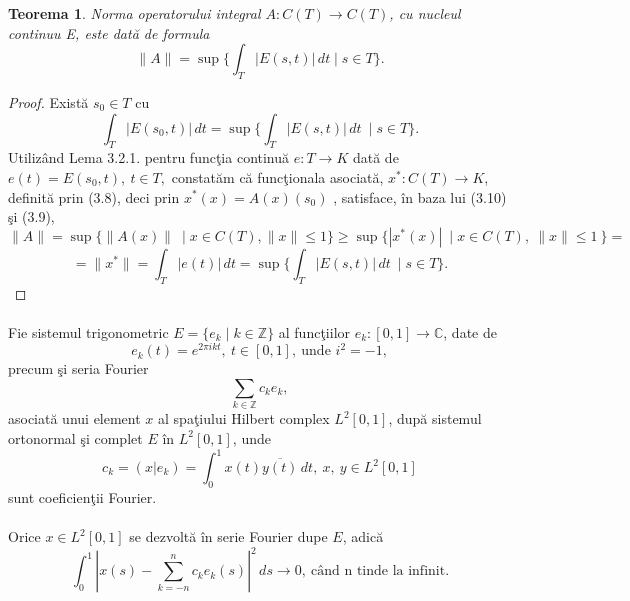 \documentclass[a4paper,openany,12pt]{report}
\newtheorem{theorem}{Teorema}[section]
\begin{document}
\begin{theorem}
Norma operatorului integral $A:C(T)\rightarrow C(T)$, cu nucleul continuu E, este dat\u a de formula
\begin{equation*}
\|A\| = \sup \bigg\{  \int_T \left| E(s,t)\right|\, dt \mid s \in T \bigg\}.
\end{equation*}
\end{theorem}
\begin{proof}Exist\u a $s_0 \in T$ cu
\begin{equation}
\int_T \left| E(s_0,t)\right|\, dt = \sup\bigg\{ \int_T \left| E(s,t)\right|\, dt\: \mid s\in T\bigg\}.
\end{equation}
Utiliz\^ and Lema 3.2.1. pentru func\c tia continu\u a $e:T\rightarrow K$ dat\u a de $e(t)=E(s_0, t),\: t\in T,$ constat\u am c\u a func\c tionala asociat\u a, $x^*:C(T)\rightarrow K$, definit\u a prin (3.8), deci prin $x^*(x)=A(x)(s_0)$ , satisface, \^ in baza lui (3.10) \c si (3.9),
\begin{equation*}
\|A\|= \sup\{\|A(x)\| \: \mid x \in C(T), \|x\| \leq 1\} \geq \sup\{\left| x^*(x)\right|\: \mid x \in C(T),\: \|x\| \leq 1\ \} =
\end{equation*}
\begin{equation*}
= \|x^*\| = \int_T \left| e(t)\right|\, dt = \sup\bigg\{ \int_T \left| E(s,t)\right|\, dt\: \mid s\in T\bigg\}.
\end{equation*} 
\end{proof}
\paragraph*{}Fie sistemul trigonometric $E = \{e_k\mid k \in \mathbb{Z}\}$ al func\c tiilor $e_k:[0,1]\rightarrow \mathbb{C}$, date de
\begin{equation*}
e_k(t)=e^{2\pi ikt}, \: t\in [0,1], \: \text{unde } i^2=-1,
\end{equation*}
precum \c si seria Fourier 
\begin{equation*}
\sum_{k \in \mathbb{Z}}c_ke_k, 
\end{equation*}
asociat\u a unui element $x$ al spa\c tiului Hilbert complex $L^2 [0,1]$, dup\u a sistemul ortonormal \c si complet $E$ \^ in $L^2 [0,1]$, unde 
\begin{equation*}
c_k=(x|e_k)=\int_0^1x(t)\overline{y(t)}\, dt,\: x,\:y \in L^2[0,1]
\end{equation*}
sunt coeficien\c tii Fourier. 
\paragraph*{}
Orice $x \in L^2[0,1]$ se dezvolt\u a \^ in serie Fourier dupe $E$, adic\u a
\begin{equation}
\int_0^1 \left| x(s) - \sum_{k=-n}^{n}c_ke_k(s)\right|^2\, ds \rightarrow 0, \:\text{c\^ and n tinde la infinit}.
\end{equation}
\end{document}
